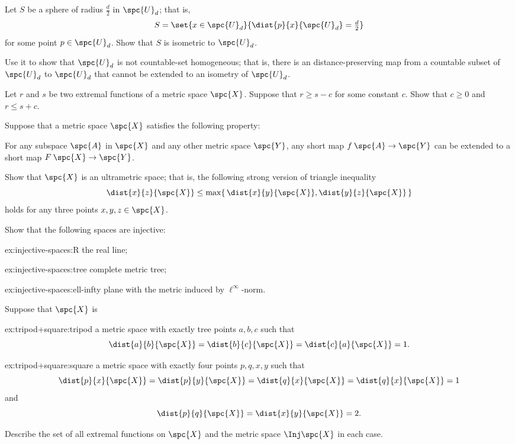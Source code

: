 \vskip 50mm

\noindent Let $S$ be a sphere of radius $\tfrac d2$ in $\spc{U}_d$;
that is, 
\[S=\set{x\in \spc{U}_d}{\dist{p}{x}{\spc{U}_d}=\tfrac d2}\]
for some point $p\in \spc{U}_d$.
Show that $S$ is isometric to $\spc{U}_d$.

Use it to show that $\spc{U}_d$ is not countable-set homogeneous;
that is, there is an distance-preserving map from a countable subset of $\spc{U}_d$ to $\spc{U}_d$ that cannot be extended to an isometry of $\spc{U}_d$.

\newpage
\pagestyle{empty}

\noindent Let $r$ and $s$ be two extremal functions of a metric space $\spc{X}$.
Suppose that $r\ge s-c$ for some constant $c$.
Show that $c\ge 0$ and $r\le s+c$.

\vskip 50mm

\noindent Suppose that a metric space $\spc{X}$ satisfies the following property:

For any subspace $\spc{A}$ in $\spc{X}$ and any other metric space $\spc{Y}$, any short map $f\:\spc{A}\to \spc{Y}$ can be extended to a short map $F\:\spc{X}\to \spc{Y}$.

Show that $\spc{X}$ is an ultrametric space;
that is, the following strong version of triangle inequality
\[\dist{x}{z}{\spc{X}}
\le
\max\{\,\dist{x}{y}{\spc{X}},\dist{y}{z}{\spc{X}}\,\}\]
holds for any three points $x,y,z\in \spc{X}$.

\vskip 50mm

\noindent Show that the following spaces are injective:
\begin{subthm}{ex:injective-spaces:R}
the real line;
\end{subthm}

\begin{subthm}{ex:injective-spaces:tree}
complete metric tree;
\end{subthm}

\begin{subthm}{ex:injective-spaces:ell-infty}
plane with the metric induced by $\ell^\infty$-norm.
\end{subthm}


\newpage
\pagestyle{empty}

\noindent Suppose that $\spc{X}$ is
\begin{subthm}{ex:tripod+square:tripod} 
a metric space with exactly tree points $a,b,c$ such that 
\[\dist{a}{b}{\spc{X}}=\dist{b}{c}{\spc{X}}=\dist{c}{a}{\spc{X}}=1.\]
\end{subthm}
\begin{subthm}{ex:tripod+square:square}
 a metric space with exactly four points $p,q,x,y$ such that 
\[\dist{p}{x}{\spc{X}}=\dist{p}{y}{\spc{X}}=\dist{q}{x}{\spc{X}}=\dist{q}{x}{\spc{X}}=1\]
and
\[\dist{p}{q}{\spc{X}}=\dist{x}{y}{\spc{X}}=2.\]
\end{subthm}
Describe the set of all extremal functions on $\spc{X}$ and the metric space $\Inj \spc{X}$ in each case.

